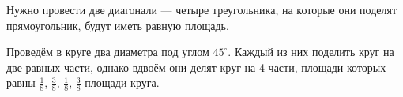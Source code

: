 \begin{itemize}

\itA Нужно провести две диагонали — четыре треугольника, на которые они поделят прямоугольник, будут иметь равную площадь.


\itC Проведём в круге два диаметра под углом $45^\circ$. Каждый из них поделить круг на две равных части, однако вдвоём они делят круг на 4 части, площади которых равны $\tfrac{1}{8}$, $\tfrac{3}{8}$, $\tfrac{1}{8}$, $\tfrac{3}{8}$ площади круга.
\end{itemize}